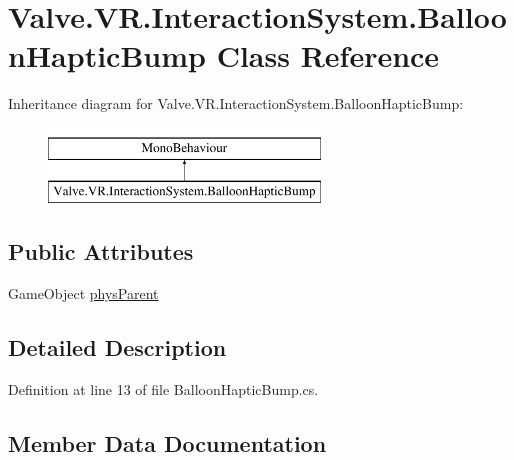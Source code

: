 \hypertarget{class_valve_1_1_v_r_1_1_interaction_system_1_1_balloon_haptic_bump}{}\section{Valve.\+V\+R.\+Interaction\+System.\+Balloon\+Haptic\+Bump Class Reference}
\label{class_valve_1_1_v_r_1_1_interaction_system_1_1_balloon_haptic_bump}
Inheritance diagram for Valve.\+V\+R.\+Interaction\+System.\+Balloon\+Haptic\+Bump\+:\begin{figure}[H]
\begin{center}
\leavevmode
\includegraphics[height=2.000000cm]{class_valve_1_1_v_r_1_1_interaction_system_1_1_balloon_haptic_bump}
\end{center}
\end{figure}
\subsection*{Public Attributes}
\begin{DoxyCompactItemize}
\item 
Game\+Object \mbox{\hyperlink{class_valve_1_1_v_r_1_1_interaction_system_1_1_balloon_haptic_bump_afc50da60708cbcef8cc5a23fb4b06c9c}{phys\+Parent}}
\end{DoxyCompactItemize}


\subsection{Detailed Description}


Definition at line 13 of file Balloon\+Haptic\+Bump.\+cs.



\subsection{Member Data Documentation}
\mbox{\label{class_valve_1_1_v_r_1_1_interaction_system_1_1_balloon_haptic_bump_afc50da60708cbcef8cc5a23fb4b06c9c}} 
